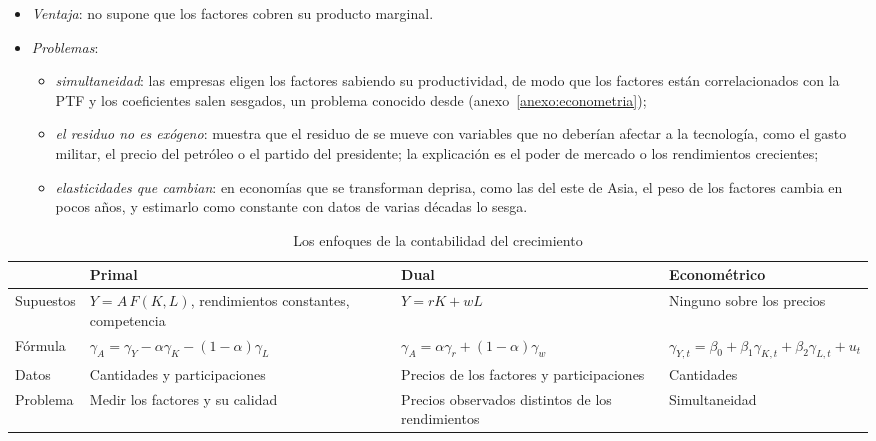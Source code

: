 \documentclass[11pt]{article}
\begin{document}
\begin{itemize}
\item \emph{Ventaja}: no supone que los factores cobren su producto marginal.
\item \emph{Problemas}:
  \begin{itemize}
  \item \emph{simultaneidad}: las empresas eligen los factores sabiendo su productividad, de modo que los factores están correlacionados con la PTF y los coeficientes salen sesgados, un problema conocido desde \textcite{MarschakAndrews1944} (anexo~\ref{anexo:econometria});
  \item \emph{el residuo no es exógeno}: \textcite{Hall1988,Hall1990} muestra que el residuo de  se mueve con variables que no deberían afectar a la tecnología, como el gasto militar, el precio del petróleo o el partido del presidente; la explicación es el poder de mercado o los rendimientos crecientes;
  \item \emph{elasticidades que cambian}: en economías que se transforman deprisa, como las del este de Asia, el peso de los factores cambia en pocos años, y estimarlo como constante con datos de varias décadas lo sesga.
  \end{itemize}
\end{itemize}
\begin{table}[H]
\centering
\caption{Los enfoques de la contabilidad del crecimiento}\label{tab:enfoques-crecimiento}
\small
\renewcommand{\arraystretch}{1.3}
\begin{tabular}{>{\raggedright\arraybackslash}m{2.4cm}>{\raggedright\arraybackslash}m{4.2cm}>{\raggedright\arraybackslash}m{3.6cm}>{\raggedright\arraybackslash}m{3.8cm}}
\toprule
\rowcolor{tceeazulpalido} & \textbf{Primal}\nocite{Solow1957} & \textbf{Dual}\nocite{Hsieh2002} & \textbf{Econométrico}\\
\midrule
Supuestos & $Y=A\,F(K,L)$, rendimientos constantes, competencia & $Y=rK+wL$ & Ninguno sobre los precios\\
Fórmula & $\gamma_A=\gamma_Y-\alpha\gamma_K-(1-\alpha)\gamma_L$ & $\gamma_A=\alpha\gamma_r+(1-\alpha)\gamma_w$ & $\gamma_{Y,t}=\beta_0+\beta_1\gamma_{K,t}+\beta_2\gamma_{L,t}+u_t$\\
Datos & Cantidades y participaciones & Precios de los factores y participaciones & Cantidades\\
Problema & Medir los factores y su calidad & Precios observados distintos de los rendimientos & Simultaneidad\\
\bottomrule
\end{tabular}

\smallskip
{}
\end{table}
\end{document}
